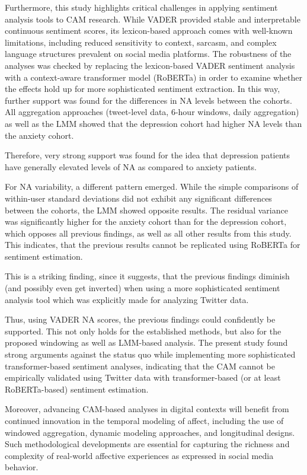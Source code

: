 Furthermore, this study highlights critical challenges in applying sentiment analysis tools to CAM research. While VADER provided stable and interpretable continuous sentiment scores, its lexicon-based approach comes with well-known limitations, including reduced sensitivity to context, sarcasm, and complex language structures prevalent on social media platforms. The robustness of the analyses was checked by replacing the lexicon-based VADER sentiment analysis with a context-aware transformer model (RoBERTa) in order to examine whether the effects hold up for more sophisticated sentiment extraction. In this way, further support was found for the differences in NA levels between the cohorts. All aggregation approaches (tweet-level data, 6-hour windows, daily aggregation) as well as the LMM showed that the depression cohort had higher NA levels than the anxiety cohort. 

Therefore, very strong support was found for the idea that depression patients have generally elevated levels of NA as compared to anxiety patients.

For NA variability, a different pattern emerged. While the simple comparisons of within-user standard deviations did not exhibit any significant differences between the cohorts, the LMM showed opposite results. The residual variance was significantly higher for the anxiety cohort than for the depression cohort, which opposes all previous findings, as well as all other results from this study. This indicates, that the previous results cannot be replicated using RoBERTa for sentiment estimation. 

This is a striking finding, since it suggests, that the previous findings diminish (and possibly even get inverted) when using a more sophisticated sentiment analysis tool which was explicitly made for analyzing Twitter data. 

Thus, using VADER NA scores, the previous findings could confidently be supported. This not only holds for the established methods, but also for the proposed windowing as well as LMM-based analysis. The present study found strong arguments against the status quo while implementing more sophisticated transformer-based sentiment analyses, indicating that the CAM cannot be empirically validated using Twitter data with transformer-based (or at least RoBERTa-based) sentiment estimation. 

Moreover, advancing CAM-based analyses in digital contexts will benefit from continued innovation in the temporal modeling of affect, including the use of windowed aggregation, dynamic modeling approaches, and longitudinal designs. Such methodological developments are essential for capturing the richness and complexity of real-world affective experiences as expressed in social media behavior.
